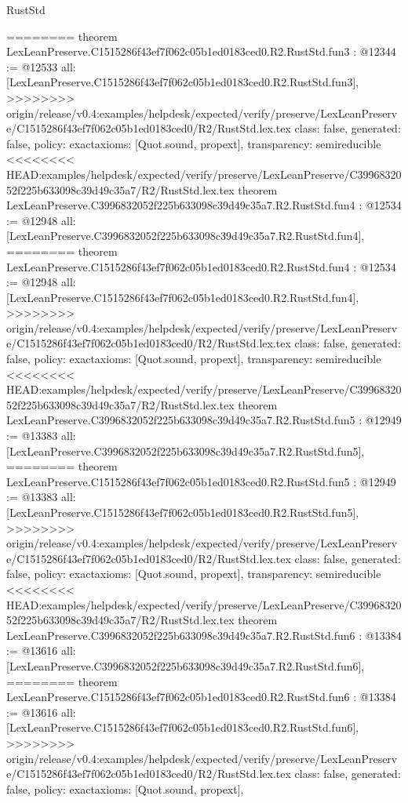 \begin{lexlean}{RustStd}
\begin{coremodule}
{\begin{coremodule}
{{{{{{========
theorem LexLeanPreserve.C1515286f43ef7f062c05b1ed0183ced0.R2.RustStd.fun3 : @12344 := @12533 {
  all: [LexLeanPreserve.C1515286f43ef7f062c05b1ed0183ced0.R2.RustStd.fun3],
>>>>>>>> origin/release/v0.4:examples/helpdesk/expected/verify/preserve/LexLeanPreserve/C1515286f43ef7f062c05b1ed0183ced0/R2/RustStd.lex.tex
  class: false,
  generated: false,
  policy: exact{axioms: [Quot.sound, propext]},
  transparency: semireducible
}
<<<<<<<< HEAD:examples/helpdesk/expected/verify/preserve/LexLeanPreserve/C3996832052f225b633098c39d49c35a7/R2/RustStd.lex.tex
theorem LexLeanPreserve.C3996832052f225b633098c39d49c35a7.R2.RustStd.fun4 : @12534 := @12948 {
  all: [LexLeanPreserve.C3996832052f225b633098c39d49c35a7.R2.RustStd.fun4],
========
theorem LexLeanPreserve.C1515286f43ef7f062c05b1ed0183ced0.R2.RustStd.fun4 : @12534 := @12948 {
  all: [LexLeanPreserve.C1515286f43ef7f062c05b1ed0183ced0.R2.RustStd.fun4],
>>>>>>>> origin/release/v0.4:examples/helpdesk/expected/verify/preserve/LexLeanPreserve/C1515286f43ef7f062c05b1ed0183ced0/R2/RustStd.lex.tex
  class: false,
  generated: false,
  policy: exact{axioms: [Quot.sound, propext]},
  transparency: semireducible
}
<<<<<<<< HEAD:examples/helpdesk/expected/verify/preserve/LexLeanPreserve/C3996832052f225b633098c39d49c35a7/R2/RustStd.lex.tex
theorem LexLeanPreserve.C3996832052f225b633098c39d49c35a7.R2.RustStd.fun5 : @12949 := @13383 {
  all: [LexLeanPreserve.C3996832052f225b633098c39d49c35a7.R2.RustStd.fun5],
========
theorem LexLeanPreserve.C1515286f43ef7f062c05b1ed0183ced0.R2.RustStd.fun5 : @12949 := @13383 {
  all: [LexLeanPreserve.C1515286f43ef7f062c05b1ed0183ced0.R2.RustStd.fun5],
>>>>>>>> origin/release/v0.4:examples/helpdesk/expected/verify/preserve/LexLeanPreserve/C1515286f43ef7f062c05b1ed0183ced0/R2/RustStd.lex.tex
  class: false,
  generated: false,
  policy: exact{axioms: [Quot.sound, propext]},
  transparency: semireducible
}
<<<<<<<< HEAD:examples/helpdesk/expected/verify/preserve/LexLeanPreserve/C3996832052f225b633098c39d49c35a7/R2/RustStd.lex.tex
theorem LexLeanPreserve.C3996832052f225b633098c39d49c35a7.R2.RustStd.fun6 : @13384 := @13616 {
  all: [LexLeanPreserve.C3996832052f225b633098c39d49c35a7.R2.RustStd.fun6],
========
theorem LexLeanPreserve.C1515286f43ef7f062c05b1ed0183ced0.R2.RustStd.fun6 : @13384 := @13616 {
  all: [LexLeanPreserve.C1515286f43ef7f062c05b1ed0183ced0.R2.RustStd.fun6],
>>>>>>>> origin/release/v0.4:examples/helpdesk/expected/verify/preserve/LexLeanPreserve/C1515286f43ef7f062c05b1ed0183ced0/R2/RustStd.lex.tex
  class: false,
  generated: false,
  policy: exact{axioms: [Quot.sound, propext]},
}}}}}}}}}}
\end{coremodule}}
\end{coremodule}
\end{lexlean}
